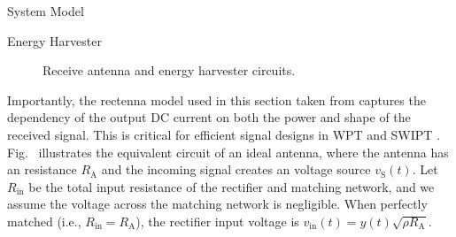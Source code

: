 \documentclass[journal]{IEEEtran}
\begin{document}
\begin{section}{System Model}
		\begin{subsection}{Energy Harvester}\label{se:energy_harvester}
			\begin{figure}[!t]
				\centering
				\caption{Receive antenna and energy harvester circuits.}
			\end{figure}

			Importantly, the rectenna model used in this section taken from \cite{Clerckx2016a} captures the dependency of the output DC current on both the power and shape of the received signal. This is critical for efficient signal designs in WPT and SWIPT \cite{Clerckx2021}. Fig.~ illustrates the equivalent circuit of an ideal antenna, where the antenna has an resistance $R_{\mathrm{A}}$ and the incoming signal creates an voltage source $v_{\mathrm{S}}(t)$. Let $R_{\mathrm{in}}$ be the total input resistance of the rectifier and matching network, and we assume the voltage across the matching network is negligible. When perfectly matched (i.e., $R_{\mathrm{in}}=R_{\mathrm{A}}$), the rectifier input voltage is $v_{\mathrm{in}}(t)=y(t)\sqrt{\rho R_{\mathrm{A}}}$.


\end{subsection}
\end{section}
\end{document}
